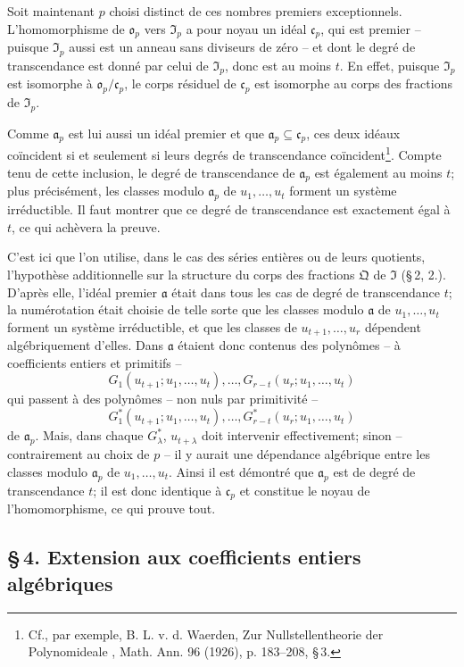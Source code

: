 Soit maintenant $p$ choisi distinct de ces nombres premiers exceptionnels. L'homomorphisme de $\mathfrak{o}_p$ vers $\mathfrak{I}_p$ a pour noyau un idéal $\mathfrak{c}_p$, qui est premier -- puisque $\mathfrak{I}_p$ aussi est un anneau sans diviseurs de zéro -- et dont le degré de transcendance est donné par celui de $\mathfrak{I}_p$, donc est au moins $t$. En effet, puisque $\mathfrak{I}_p$ est isomorphe à $\mathfrak{o}_p/\mathfrak{c}_p$, le corps résiduel de $\mathfrak{c}_p$ est isomorphe au corps des fractions de $\mathfrak{I}_p$.

Comme $\mathfrak{a}_p$ est lui aussi un idéal premier et que $\mathfrak{a}_p\subseteq\mathfrak{c}_p$, ces deux idéaux coïncident si et seulement si leurs degrés de transcendance coïncident\footnote{Cf., par exemple, B. L. v. d. Waerden, \og{} Zur Nullstellentheorie der Polynomideale \fg{}, Math. Ann. 96 (1926), p. 183--208, \S\,3.}. Compte tenu de cette inclusion, le degré de transcendance de $\mathfrak{a}_p$ est également au moins $t$; plus précisément, les classes modulo $\mathfrak{a}_p$ de $u_1,\ldots,u_t$ forment un système irréductible. Il faut montrer que ce degré de transcendance est exactement égal à $t$, ce qui achèvera la preuve.

C'est ici que l'on utilise, dans le cas des séries entières ou de leurs quotients, l'hypothèse additionnelle sur la structure du corps des fractions $\mathfrak{Q}$ de $\mathfrak{I}$ (\S\,2, 2.). D'après elle, l'idéal premier $\mathfrak{a}$ était dans tous les cas de degré de transcendance $t$; la numérotation était choisie de telle sorte que les classes modulo $\mathfrak{a}$ de $u_1,\ldots,u_t$ forment un système irréductible, et que les classes de $u_{t+1},\ldots,u_r$ dépendent algébriquement d'elles. Dans $\mathfrak{a}$ étaient donc contenus des polynômes -- à coefficients entiers et primitifs --
\[
G_1(u_{t+1};u_1,\ldots,u_t),\ldots,G_{r-t}(u_r;u_1,\ldots,u_t)\tag{1}
\]
qui passent à des polynômes -- non nuls par primitivité --
\[
G^*_1(u_{t+1};u_1,\ldots,u_t),\ldots,G^*_{r-t}(u_r;u_1,\ldots,u_t)\tag{2}
\]
de $\mathfrak{a}_p$. Mais, dans chaque $G^*_{\lambda}$, $u_{t+\lambda}$ doit intervenir effectivement; sinon -- contrairement au choix de $p$ -- il y aurait une dépendance algébrique entre les classes modulo $\mathfrak{a}_p$ de $u_1,\ldots,u_t$. Ainsi il est démontré que $\mathfrak{a}_p$ est de degré de transcendance $t$; il est donc identique à $\mathfrak{c}_p$ et constitue le noyau de l'homomorphisme, ce qui prouve tout.

\subsection*{\S\,4. Extension aux coefficients entiers algébriques}


